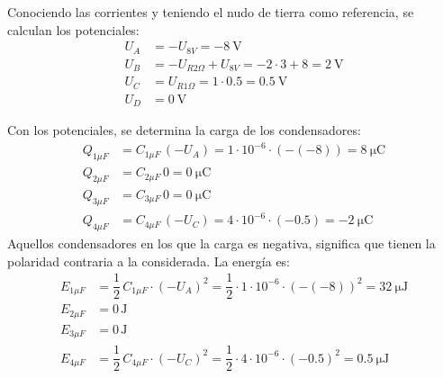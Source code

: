 Conociendo las corrientes y teniendo el nudo de tierra como
referencia, se calculan los potenciales:
\begin{align*}
  U_A&=-U_{8V}=\qty{-8}{\volt}\\
  U_B&=-U_{R2\Omega}+U_{8V}=-2\cdot 3+8=\qty{2}{\volt}\\
  U_C&=U_{R1\Omega}=1\cdot 0.5=\qty{0.5}{\volt}\\
  U_D&=\qty{0}{\volt}
\end{align*}

Con los potenciales, se determina la carga de los condensadores:
\begin{align*}
  Q_{1\mu F}&=C_{1\mu F}\, (-U_{A}) = 1\cdot 10^{-6}\cdot (-(-8))=\qty{8}{\micro\coulomb}\\
  Q_{2\mu F}&=C_{2\mu F}\, 0 = \qty{0}{\micro\coulomb}\\
  Q_{3\mu F}&=C_{3\mu F}\, 0 = \qty{0}{\micro\coulomb}\\
  Q_{4\mu F}&=C_{4\mu F}\, (-U_C) = 4\cdot 10^{-6}\cdot (-0.5)=\qty{-2}{\micro\coulomb}
\end{align*}
Aquellos condensadores en los que la carga es negativa, significa que
tienen la polaridad contraria a la considerada. La energía es:
\begin{align*}
  E_{1\mu F}&=\dfrac{1}{2}\,C_{1\mu F}\cdot (-U_{A})^2 = \dfrac{1}{2}\cdot 1\cdot 10^{-6}\cdot (-(-8))^2=\qty{32}{\micro\joule}\\
  E_{2\mu F}&=0\,\text{J}\\
  E_{3\mu F}&=0\,\text{J}\\
  E_{4\mu F}&=\dfrac{1}{2}\,C_{4\mu F}\cdot (-U_{C})^2 = \dfrac{1}{2}\cdot 4\cdot 10^{-6}\cdot (-0.5)^2=\qty{0.5}{\micro\joule}
\end{align*}

